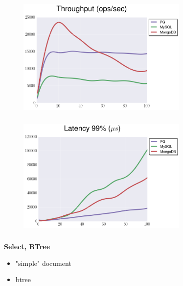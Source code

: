 \documentclass[usenames,dvipsnames, 18pt, compress, aspectratio=169]{beamer}
\begin{document}
\begin{frame}
    \frametitle{}
    \begin{center}
    \begin{figure}
        \includegraphics[width=0.75\textwidth,center]{benchmarks/select_jsonb_path_ops_throughput.png}
    \end{figure}
    \end{center}
\end{frame}

\begin{frame}
    \frametitle{}
    \begin{center}
    \begin{figure}
        \includegraphics[width=0.75\textwidth,center]{benchmarks/select_jsonb_path_ops_latency_99.png}
    \end{figure}
    \end{center}
\end{frame}

\begin{frame}
    \frametitle{}
    \begin{center}
        \textbf{Select, BTree }
        \begin{itemize}[label={}]
            \item "simple" document
            \item btree
        \end{itemize}
    \end{center}
\end{frame}
\end{document}
